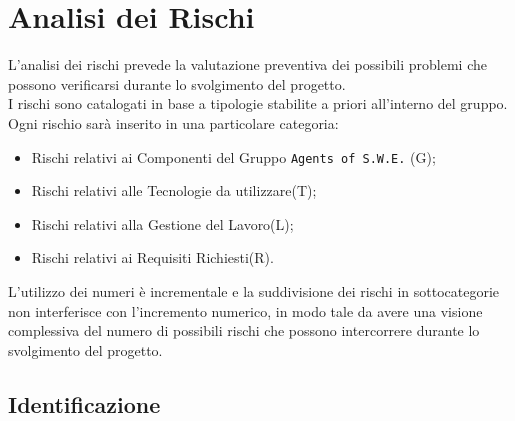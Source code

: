 \section{Analisi dei Rischi}
\label{RischiIntroduzione}

L'analisi dei rischi prevede la valutazione preventiva dei possibili problemi che possono verificarsi durante lo svolgimento del progetto. \\
I rischi sono catalogati in base a tipologie stabilite a priori all'interno del gruppo. 
Ogni rischio sarà inserito in una particolare categoria:
\begin{itemize}
\item Rischi relativi ai Componenti del Gruppo \texttt{Agents of S.W.E.} (G);
\item Rischi relativi alle Tecnologie da utilizzare(T);
\item Rischi relativi alla Gestione del Lavoro(L);
\item Rischi relativi ai Requisiti Richiesti(R).  
\end{itemize}

L'utilizzo dei numeri è incrementale e la suddivisione dei rischi in sottocategorie non interferisce con l'incremento numerico, in modo tale da avere una visione complessiva del numero di possibili rischi che possono intercorrere durante lo svolgimento del progetto. \\

\subsection{Identificazione}
\label{RischiIdentificazione}

